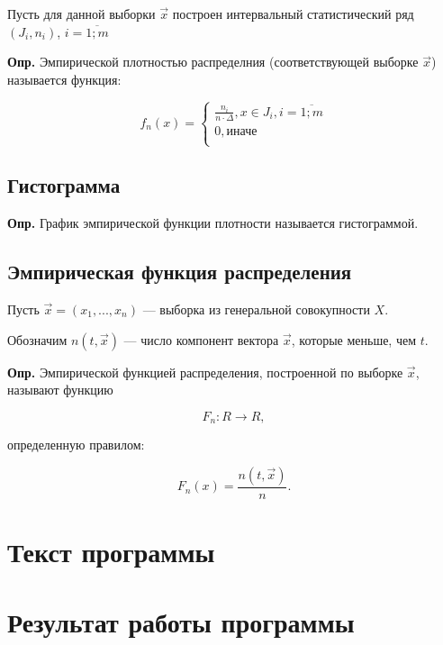 \documentclass[a4paper,14pt, unknownkeysallowed]{extreport}
\begin{document}
Пусть для данной выборки $\vec x$ построен интервальный статистический ряд $(J_i, n_i)$, $i = \overline{1; m}$\newline

\textbf{Опр.} Эмпирической плотностью распределния (соответствующей выборке $\vec x$) называется функция:

\begin{equation}
    f_n(x) =
    \begin{cases}
        \frac{n_i}{n \cdot \Delta}, x \in J_i, i = \overline{1; m} \\
        0, \text{иначе} \\
    \end{cases}
\end{equation}


\section{Гистограмма}

\textbf{Опр.} График эмпирической функции плотности называется гистограммой.


\section{Эмпирическая функция распределения}

Пусть $\vec x = (x_1, ..., x_n)$ --- выборка из генеральной совокупности $X$.

Обозначим $n(t, \vec x)$ --- число компонент вектора $\vec x$, которые меньше, чем $t$.\newline

\textbf{Опр.} Эмпирической функцией распределения, построенной по выборке $\vec x$, называют функцию

\begin{equation}
    F_n: {R} \to {R},
\end{equation}

определенную правилом:

\begin{equation}
    F_n(x) = \frac{n(t, \vec x)}{n}.
\end{equation}

\chapter{Текст программы}



\chapter{Результат работы программы}
\end{document}
